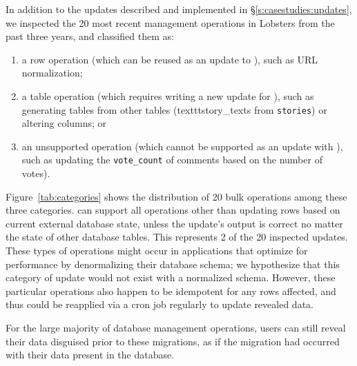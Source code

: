 %
In addition to the updates described and implemented in
\S\ref{s:casestudies:updates}, we inspected the 20 most recent management operations in
Lobsters from the past three years, and classified them as:
\begin{enumerate}[nosep]
%
    \item a row operation (which can be reused as an update to \sys), such as URL
normalization; 
%
\item a table operation (which requires writing a new update for \sys), such as
generating tables from other tables (\eg texttt{story\_texts} from
\texttt{stories}) or altering columns; or
%
\item an unsupported operation (which cannot be supported as an update with
    \sys), such as updating the \texttt{vote\_count} of comments based on the number of votes).
\end{enumerate}
Figure~\ref{tab:categories} shows the distribution of 20 bulk operations among these
three categories. 
%
\sys can support all operations other than updating rows based
on current external database state, unless the update's output is correct no
matter the state of other database tables. This represents 2 of the 20 inspected
updates.
%
%
%
These types of operations might occur in applications that optimize for
performance by denormalizing their database schema; we hypothesize that this
category of update would not exist with a normalized schema.
%
However, these particular operations also happen to be idempotent for any rows
affected, and thus could be reapplied via \eg a cron job regularly to update
revealed data.
%

%
For the large majority of database management operations, users can still reveal
their data disguised prior to these migrations, as if the migration had occurred
with their data present in the database.

%

